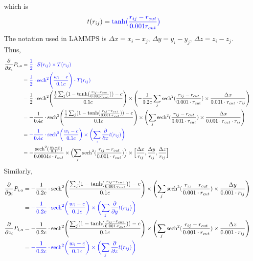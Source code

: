 \documentclass[11pt, oneside]{article}   	%
\begin{document}
which is 
\begin{align*}
t(r_{ij}) &=\color{blue} \textrm{tanh} \bigl(\frac{r_{ij} - r_{cut}}{0.001r_{cut}}\bigr) 
\end{align*}
The notation used in LAMMPS is $\Delta x = x_i - x_j, \, \Delta y = y_i - y_j,\, \Delta z = z_i - z_j$. Thus,
\begin{align*}
\frac{\partial}{\partial x_i} P_{i,a} & =  \color{blue} \frac{1}{2} \cdot S(r_{ij}) \times T(r_{ij})\\
&= \color{blue} \frac{1}{2}\cdot \textrm{sech}^2 \Biggl( \frac{w_i - c}{0.1c}\Biggr) \cdot \color{blue} T(r_{ij}) \\
& = \frac{1}{2} \cdot \textrm{sech}^2 \Biggl(\frac{ \frac{1}{2}  \sum_j (1-\textrm{tanh}(\frac{r_{ij} -r_{cut}}{0.001\cdot r_{cut}})) - c}{0.1c}\Biggr)  \times \Biggl( - \frac{1}{0.2c} \sum_j \textrm{sech}^2(\frac{r_{ij} - r_{cut}}{0.001\cdot r_{cut}}) \times \frac{\Delta x}{0.001\cdot r_{cut} \cdot r_{ij}} \Biggr) \\
&= -\frac{1}{0.4c } \cdot \textrm{sech}^2 \Biggl(\frac{  \frac{1}{2} \sum_j (1-\textrm{tanh}(\frac{r_{ij} - r_{cut}}{0.001 \cdot r_{cut}})) - c}{0.1c}\Biggr) \times \Biggl( \sum_j \textrm{sech}^2(\frac{r_{ij} -  r_{cut}}{0.001\cdot r_{cut}}) \times \frac{\Delta x}{0.001\cdot r_{cut} \cdot  r_{ij}} \Biggr) \\
&= \color{blue}-\frac{1}{0.4c} \cdot \textrm{sech}^2 \biggl( \frac{w_i - c}{0.1c}\biggr) \times \biggl( \sum_j \frac{\partial}{\partial x} t(r_{ij}) \biggr) \\
& = -\frac{\textrm{sech}^2 (\frac{w_i-c}{0.1c})}{0.0004 c \cdot r_{cut}} \times \Bigl( \sum_j \textrm{sech}^2 (\frac{r_{ij}-r_{cut}}{0.001\cdot r_{cut}})\Bigr)  \times   \Big[\frac{\Delta x}{r_{ij}},\frac{\Delta y}{r_{ij}},\frac{\Delta z}{r_{ij}}\Big]
\end{align*}
Similarly,
\begin{align*}
\frac{\partial}{\partial y_i} P_{i,a} & =  -\frac{1}{0.2c } \cdot \textrm{sech}^2 \Biggl(\frac{ \sum_j (1-\textrm{tanh}(\frac{r_{ij} - r_{cut}}{0.001 \cdot r_{cut}})) - c}{0.1c}\Biggr) \times \Biggl( \sum_j \textrm{sech}^2(\frac{r_{ij} -  r_{cut}}{0.001\cdot r_{cut}}) \times \frac{\Delta y}{0.001\cdot r_{ij}} \Biggr) \\
&=  \color{blue}-\frac{1}{0.2c} \cdot \textrm{sech}^2 \biggl( \frac{w_i - c}{0.1c}\biggr) \times \biggl( \sum_j \frac{\partial}{\partial y} t(r_{ij}) \biggr) \\
\frac{\partial}{\partial z_i} P_{i,a} & = -\frac{1}{0.2c } \cdot \textrm{sech}^2 \Biggl(\frac{ \sum_j (1-\textrm{tanh}(\frac{r_{ij} - r_{cut}}{0.001 \cdot r_{cut}})) - c}{0.1c}\Biggr) \times \Biggl( \sum_j \textrm{sech}^2(\frac{r_{ij} -  r_{cut}}{0.001\cdot r_{cut}}) \times \frac{\Delta z}{0.001\cdot r_{ij}} \Biggr)\\
&=  \color{blue}-\frac{1}{0.2c} \cdot \textrm{sech}^2 \biggl( \frac{w_i - c}{0.1c}\biggr) \times \biggl( \sum_j \frac{\partial}{\partial z} t(r_{ij}) \biggr) 
\end{align*}
\end{document}
